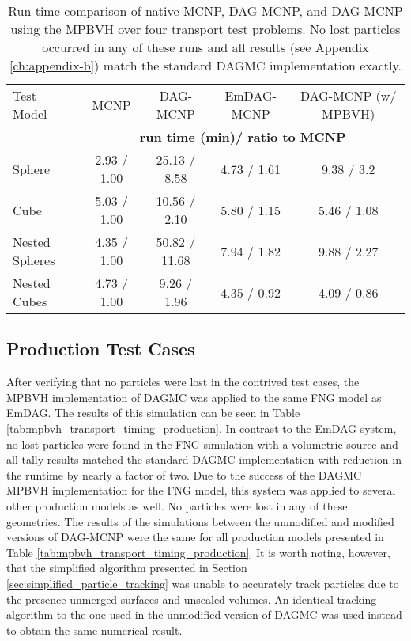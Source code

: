 \begin{table}[H]
  \small
  \begin{center}
    \begin{tabular}{lcccc}

      \toprule
      Test Model & MCNP & DAG-MCNP & EmDAG-MCNP & DAG-MCNP (w/ MPBVH) \\
      & \multicolumn{4}{c}{\textbf{run time (min)/ ratio to MCNP}} \\
      \hline
      Sphere         & 2.93 / 1.00 & 25.13 / 8.58  & 4.73 / 1.61 & 9.38 / 3.2  \\
      Cube           & 5.03 / 1.00 & 10.56 / 2.10 & 5.80 / 1.15 & 5.46 / 1.08  \\
      Nested Spheres & 4.35 / 1.00  & 50.82 / 11.68  & 7.94 / 1.82 & 9.88 / 2.27 \\
      Nested Cubes   & 4.73 / 1.00 & 9.26 / 1.96 &  4.35 / 0.92 & 4.09 / 0.86 \\
      \bottomrule
    \end{tabular}
  \end{center}
  \caption[Performance results for simple DAG-MCNP test cases.]{Run time
    comparison of native MCNP, DAG-MCNP, and DAG-MCNP using the MPBVH over four
    transport test problems. No lost particles occurred in any of these runs and
    all results (see Appendix \ref{ch:appendix-b}) match the standard DAGMC
    implementation exactly.}
  \label{tab:mpbvh_transport_timing_simple}
\end{table}

\subsection{Production Test Cases}\label{subsec:mpbvh_production_transport}

After verifying that no particles were lost in the contrived test cases, the
MPBVH implementation of DAGMC was applied to the same FNG model as EmDAG. The
results of this simulation can be seen in Table
\ref{tab:mpbvh_transport_timing_production}. In contrast to the EmDAG system, no
lost particles were found in the FNG simulation with a volumetric source and all
tally results matched the standard DAGMC implementation with reduction in the
runtime by nearly a factor of two. Due to the success of the DAGMC MPBVH
implementation for the FNG model, this system was applied to several other
production models as well. No particles were lost in any of these
geometries. The results of the simulations between the unmodified and modified
versions of DAG-MCNP were the same for all production models presented in Table
\ref{tab:mpbvh_transport_timing_production}. It is worth noting, however, that
the simplified algorithm presented in Section
\ref{sec:simplified_particle_tracking} was unable to accurately track particles
due to the presence unmerged surfaces and unsealed volumes. An identical
tracking algorithm to the one used in the unmodified version of DAGMC was used
instead to obtain the same numerical result.

